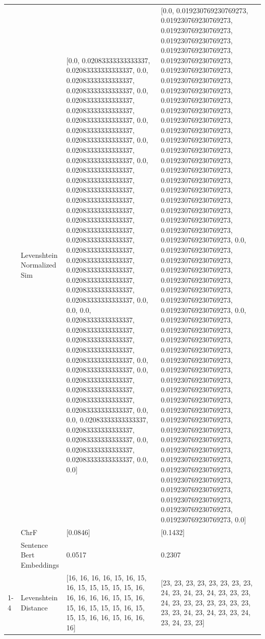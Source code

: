 \begin{tabular}{llll}
 & Levenshtein Normalized Sim & [0.0, 0.02083333333333337, 0.02083333333333337, 0.0, 0.02083333333333337, 0.02083333333333337, 0.0, 0.02083333333333337, 0.02083333333333337, 0.02083333333333337, 0.0, 0.02083333333333337, 0.02083333333333337, 0.0, 0.02083333333333337, 0.02083333333333337, 0.0, 0.02083333333333337, 0.02083333333333337, 0.02083333333333337, 0.02083333333333337, 0.02083333333333337, 0.02083333333333337, 0.02083333333333337, 0.02083333333333337, 0.02083333333333337, 0.02083333333333337, 0.02083333333333337, 0.02083333333333337, 0.02083333333333337, 0.02083333333333337, 0.0, 0.0, 0.0, 0.02083333333333337, 0.02083333333333337, 0.02083333333333337, 0.02083333333333337, 0.02083333333333337, 0.0, 0.02083333333333337, 0.0, 0.02083333333333337, 0.02083333333333337, 0.02083333333333337, 0.02083333333333337, 0.0, 0.0, 0.02083333333333337, 0.02083333333333337, 0.02083333333333337, 0.0, 0.02083333333333337, 0.02083333333333337, 0.0, 0.0] & [0.0, 0.019230769230769273, 0.019230769230769273, 0.019230769230769273, 0.019230769230769273, 0.019230769230769273, 0.019230769230769273, 0.019230769230769273, 0.019230769230769273, 0.019230769230769273, 0.019230769230769273, 0.019230769230769273, 0.019230769230769273, 0.019230769230769273, 0.019230769230769273, 0.019230769230769273, 0.019230769230769273, 0.019230769230769273, 0.019230769230769273, 0.019230769230769273, 0.019230769230769273, 0.019230769230769273, 0.019230769230769273, 0.019230769230769273, 0.019230769230769273, 0.0, 0.019230769230769273, 0.019230769230769273, 0.019230769230769273, 0.019230769230769273, 0.019230769230769273, 0.019230769230769273, 0.019230769230769273, 0.0, 0.019230769230769273, 0.019230769230769273, 0.019230769230769273, 0.019230769230769273, 0.019230769230769273, 0.019230769230769273, 0.019230769230769273, 0.019230769230769273, 0.019230769230769273, 0.019230769230769273, 0.019230769230769273, 0.019230769230769273, 0.019230769230769273, 0.019230769230769273, 0.019230769230769273, 0.019230769230769273, 0.019230769230769273, 0.019230769230769273, 0.019230769230769273, 0.019230769230769273, 0.019230769230769273, 0.0] \\
 & ChrF & [0.0846] & [0.1432] \\
 & Sentence Bert Embeddings & 0.0517 & 0.2307 \\
\cline{1-4}
\multirow[t]{4}{*}{Kwigita ti guoya} & Levenshtein Distance & [16, 16, 16, 16, 15, 16, 15, 16, 15, 15, 15, 15, 15, 16, 16, 16, 16, 16, 15, 15, 16, 15, 16, 15, 15, 15, 16, 15, 15, 15, 16, 16, 15, 16, 16, 16] & [23, 23, 23, 23, 23, 23, 23, 23, 24, 23, 24, 23, 24, 23, 23, 23, 24, 23, 23, 23, 23, 23, 23, 23, 23, 23, 24, 23, 24, 23, 23, 24, 23, 24, 23, 23] \\

\end{tabular}

